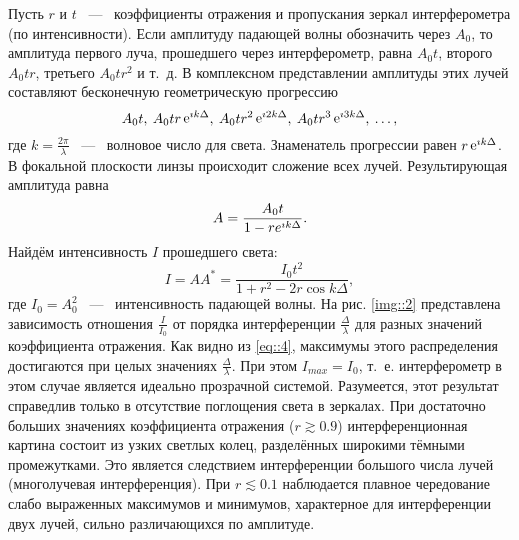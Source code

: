 Пусть $r$ и $t$ ~---~ коэффициенты отражения и пропускания зеркал интерферометра (по интенсивности).
Если амплитуду падающей волны обозначить через $A_0$, то амплитуда 
первого луча, прошедшего через интерферометр, равна $A_0t$, 
второго $A_0tr$, третьего $A_0tr^2$ и т.~д.
В комплексном представлении амплитуды этих лучей составляют бесконечную геометрическую прогрессию
\begin{equation}\label{eq::2}
  A_0t, \: 
  A_0tr\mathop{\mathrm e}\nolimits^{\imath k \Delta}, \: 
  A_0tr^2\mathop{\mathrm e}\nolimits^{\imath 2k \Delta}, \:
  A_0tr^3\mathop{\mathrm e}\nolimits^{\imath 3k \Delta}, \:
  \dots , 
\end{equation}
\noindent где $k = \frac{2\pi}{\lambda}$ ~---~ волновое число 
для света. Знаменатель прогрессии равен $r\mathop{\mathrm e}\nolimits^{\imath k\Delta}$. 
В фокальной плоскости линзы происходит сложение всех лучей.
Результирующая амплитуда равна
\begin{equation}\label{eq::3}
  A = \frac{A_0t}{1 - re^{\imath k\Delta}}.
\end{equation}
Найдём интенсивность $I$ прошедшего света:
\begin{equation}\label{eq::4}
  I = AA^* = \frac{I_0t^2}{1 + r^2 - 2r\cos{k\Delta}},
\end{equation}
где $I_0 = A^2_0$ ~---~ интенсивность падающей волны. 
На рис. \ref{img::2} представлена зависимость отношения $\frac{I}{I_0}$ 
от порядка интерференции $\frac{\Delta}{\lambda}$ для разных
значений коэффициента отражения. Как видно из \eqref{eq::4}, 
максимумы этого распределения достигаются при целых значениях
$\frac{\Delta}{\lambda}$. При этом $I_{max} = I_0$, т.~е. 
интерферометр в этом случае является идеально прозрачной системой.
Разумеется, этот результат справедлив только в отсутствие поглощения света в зеркалах.
При достаточно больших значениях коэффициента отражения ($r \gtrsim 0.9$)
интерференционная картина состоит из узких светлых колец, 
разделённых широкими тёмными промежутками. Это является следствием
интерференции большого числа лучей (многолучевая интерференция).
При $r \lesssim 0.1$ наблюдается плавное чередование слабо выраженных 
максимумов и минимумов, характерное для интерференции двух лучей,
сильно различающихся по амплитуде.